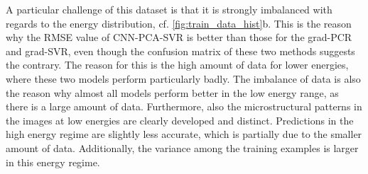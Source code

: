 \documentclass[11pt, authoryear]{elsarticle}
\begin{document}
	A particular challenge of this dataset is that it is strongly imbalanced 
	with regards to the energy distribution, cf. \cref{fig:train_data_hist}b.
	This is the reason why the RMSE value of CNN-PCA-SVR is better 
	than those for the grad-PCR and grad-SVR, even though the confusion 
	matrix of these two methods suggests the contrary. The reason for this is 
	the high amount of data for lower energies, where these two models 
	perform particularly badly. The imbalance of data is also the reason why 
	almost all models perform better in the low energy range, as there is a 
	large amount of data. Furthermore, also the microstructural patterns in the 
	images at low energies are clearly developed and distinct. Predictions in 
	the high energy regime are slightly less accurate, which is partially due to 
	the smaller amount of data. Additionally,  the variance among the training 
	examples is larger in this energy regime. 
	
	
\end{document}
